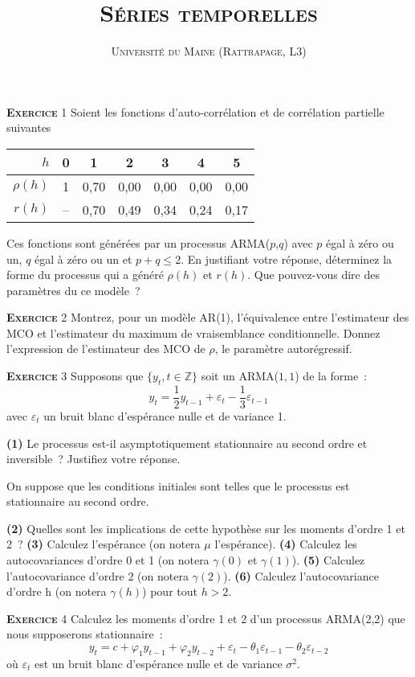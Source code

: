 \documentclass[10pt,a4paper,notitlepage,onecolumn]{article}
\newcommand{\exercice}[1]{\textsc{\textbf{Exercice}} #1}
\newcommand{\question}[1]{\textbf{(#1)}}
\begin{document}
\title{\textsc{Séries temporelles}}
\author{\textsc{Université du Maine (Rattrapage, L3)}}
\date{}


\maketitle

\exercice{1} Soient les fonctions d'auto-corrélation et de corrélation
partielle suivantes
\begin{table}[H]
  \centering
  \begin{tabular}{r|cccccc}
    \hline\hline
    $h$ & 0 & 1 & 2 & 3 & 4 & 5 \\\hline
    $\rho (h)$ & 1 & 0,70 & 0,00 & 0,00 & 0,00 & 0,00\\
    $r (h)$ & -- & 0,70 & 0,49 & 0,34 & 0,24 & 0,17\\
    \hline\hline
  \end{tabular}
\end{table}
\noindent Ces  fonctions sont générées par  un processus ARMA($p$,$q$)
avec $p$ égal à zéro ou un, $q$ égal  à zéro ou un et $p+q \leq 2$. En
justifiant  votre réponse,  déterminez  la forme  du  processus qui  a
généré $\rho(h)$ et $r(h)$. Que  pouvez-vous dire des paramètres du ce
modèle~?

\bigskip
\bigskip


\exercice{2}  Montrez,  pour  un  modèle  AR(1),  l'équivalence  entre
l'estimateur  des  MCO et  l'estimateur  du  maximum de  vraisemblance
conditionnelle. Donnez l'expression de l'estimateur des MCO de $\rho$,
le paramètre autorégressif.

\bigskip
\bigskip

\exercice{3} Supposons que $\{y_t,t\in\mathbb Z\}$ soit un ARMA($1,1$) de la forme :
\[
y_t = \frac{1}{2}y_{t-1} + \varepsilon_t - \frac{1}{3} \varepsilon_{t-1}
\]
avec $\varepsilon_t$ un bruit blanc d'espérance nulle et de variance 1.\newline

\question{1}   Le    processus   est-il   asymptotiquement
stationnaire  au   second  ordre   et  inversible~?   Justifiez  votre
réponse.\newline

On suppose  que les conditions initiales sont  telles que le
processus est stationnaire au second ordre.\newline

\question{2} Quelles sont les implications de cette hypothèse sur les moments d'ordre 1 et 2 ? \question{3} Calculez l'espérance (on notera $\mu$ l'espérance). \question{4} Calculez les autocovariances d'ordre 0 et 1 (on notera $\gamma(0)$ et $\gamma(1)$). \question{5} Calculez l'autocovariance d'ordre 2 (on notera $\gamma(2)$). \question{6} Calculez l'autocovariance d'ordre h (on notera $\gamma(h)$) pour tout $h>2$.

\bigskip
\bigskip

\exercice{4} Calculez les moments d'ordre 1 et 2 d'un processus ARMA(2,2) que nous supposerons stationnaire :
\[
y_t = c + \varphi_1 y_{t-1} + \varphi_2 y_{t-2} + \varepsilon_t - \theta_1 \varepsilon_{t-1} - \theta_2 \varepsilon_{t-2}
\]
où $\varepsilon_t$ est un bruit blanc d'espérance nulle et de variance $\sigma^2$. 
\end{document}
